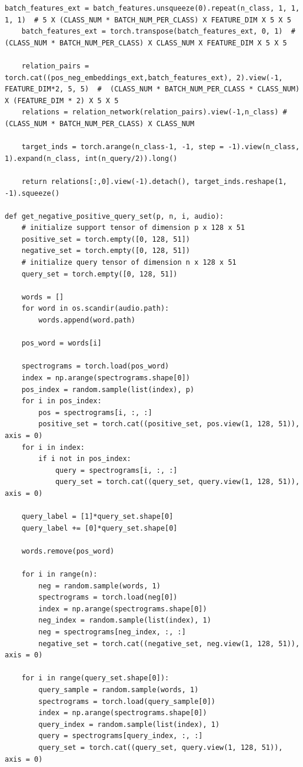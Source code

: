 \documentclass[12pt,a4paper,titlepage]{article}
\begin{document}
\begin{lstlisting}[language=iPython,firstnumber=1, caption=relation\_test.py, label=relation test,captionpos=b]
    batch_features_ext = batch_features.unsqueeze(0).repeat(n_class, 1, 1, 1, 1)  # 5 X (CLASS_NUM * BATCH_NUM_PER_CLASS) X FEATURE_DIM X 5 X 5
    batch_features_ext = torch.transpose(batch_features_ext, 0, 1)  #  (CLASS_NUM * BATCH_NUM_PER_CLASS) X CLASS_NUM X FEATURE_DIM X 5 X 5

    relation_pairs = torch.cat((pos_neg_embeddings_ext,batch_features_ext), 2).view(-1, FEATURE_DIM*2, 5, 5)  #  (CLASS_NUM * BATCH_NUM_PER_CLASS * CLASS_NUM) X (FEATURE_DIM * 2) X 5 X 5
    relations = relation_network(relation_pairs).view(-1,n_class) #  (CLASS_NUM * BATCH_NUM_PER_CLASS) X CLASS_NUM
    
    target_inds = torch.arange(n_class-1, -1, step = -1).view(n_class, 1).expand(n_class, int(n_query/2)).long()
    
    return relations[:,0].view(-1).detach(), target_inds.reshape(1, -1).squeeze()

def get_negative_positive_query_set(p, n, i, audio):
    # initialize support tensor of dimension p x 128 x 51
    positive_set = torch.empty([0, 128, 51])
    negative_set = torch.empty([0, 128, 51])
    # initialize query tensor of dimension n x 128 x 51
    query_set = torch.empty([0, 128, 51])
    
    words = []
    for word in os.scandir(audio.path):
        words.append(word.path)
        
    pos_word = words[i]

    spectrograms = torch.load(pos_word)
    index = np.arange(spectrograms.shape[0])
    pos_index = random.sample(list(index), p)
    for i in pos_index:
        pos = spectrograms[i, :, :]
        positive_set = torch.cat((positive_set, pos.view(1, 128, 51)), axis = 0)
    for i in index:
        if i not in pos_index:
            query = spectrograms[i, :, :]
            query_set = torch.cat((query_set, query.view(1, 128, 51)), axis = 0)

    query_label = [1]*query_set.shape[0]
    query_label += [0]*query_set.shape[0]

    words.remove(pos_word)

    for i in range(n):
        neg = random.sample(words, 1)
        spectrograms = torch.load(neg[0])
        index = np.arange(spectrograms.shape[0])
        neg_index = random.sample(list(index), 1)
        neg = spectrograms[neg_index, :, :]
        negative_set = torch.cat((negative_set, neg.view(1, 128, 51)), axis = 0)

    for i in range(query_set.shape[0]):
        query_sample = random.sample(words, 1)
        spectrograms = torch.load(query_sample[0])
        index = np.arange(spectrograms.shape[0])
        query_index = random.sample(list(index), 1)
        query = spectrograms[query_index, :, :]
        query_set = torch.cat((query_set, query.view(1, 128, 51)), axis = 0)
        

\end{lstlisting}
\end{document}
